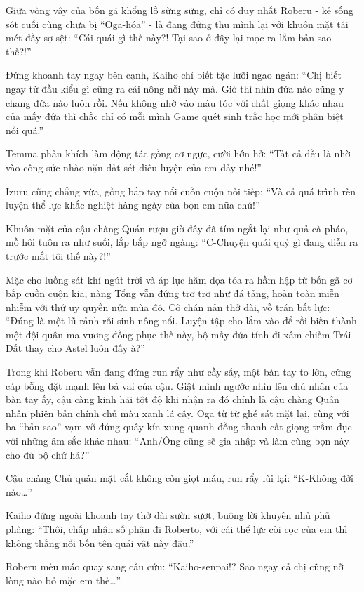 \documentclass[../main.tex]{subfiles}
\begin{document}
Giữa vòng vây của bốn gã khổng lồ sừng sững, chỉ có duy nhất Roberu - kẻ sống sót cuối cùng chưa bị ``Oga-hóa'' - là đang đứng thu mình lại với khuôn mặt tái mét đầy sợ sệt: ``Cái quái gì thế này?! Tại sao ở đây lại mọc ra lắm bản sao thế?!''

Đứng khoanh tay ngay bên cạnh, Kaiho chỉ biết tặc lưỡi ngao ngán: ``Chị biết ngay từ đầu kiểu gì cũng ra cái nông nỗi này mà. Giờ thì nhìn đứa nào cũng y chang đứa nào luôn rồi. Nếu không nhờ vào màu tóc với chất giọng khác nhau của mấy đứa thì chắc chỉ có mỗi mình Game quét sinh trắc học mới phân biệt nổi quá.''

Temma phấn khích làm động tác gồng cơ ngực, cười hớn hở: ``Tất cả đều là nhờ vào công sức nhào nặn đất sét điêu luyện của em đấy nhé!''

Izuru cũng chẳng vừa, gồng bắp tay nổi cuồn cuộn nối tiếp: ``Và cả quá trình rèn luyện thể lực khắc nghiệt hàng ngày của bọn em nữa chứ!''

Khuôn mặt của cậu chàng Quán rượu giờ đây đã tím ngắt lại như quả cà pháo, mồ hôi tuôn ra như suối, lắp bắp ngỡ ngàng: ``C-Chuyện quái quỷ gì đang diễn ra trước mắt tôi thế này?!''

Mặc cho luồng sát khí ngút trời và áp lực hăm dọa tỏa ra hầm hập từ bốn gã cơ bắp cuồn cuộn kia, nàng Tổng vẫn đứng trơ trơ như đá tảng, hoàn toàn miễn nhiễm với thứ uy quyền nửa mùa đó. Cô chán nản thở dài, vỗ trán bất lực: ``Đúng là một lũ rảnh rỗi sinh nông nổi. Luyện tập cho lắm vào để rồi biến thành một đội quân ma vương đồng phục thế này, bộ mấy đứa tính đi xâm chiếm Trái Đất thay cho Astel luôn đấy à?''

Trong khi Roberu vẫn đang đứng run rẩy như cầy sấy, một bàn tay to lớn, cứng cáp bỗng đặt mạnh lên bả vai của cậu. Giật mình ngước nhìn lên chủ nhân của bàn tay ấy, cậu càng kinh hãi tột độ khi nhận ra đó chính là cậu chàng Quân nhân phiên bản chính chủ màu xanh lá cây. Oga từ từ ghé sát mặt lại, cùng với ba ``bản sao'' vạm vỡ đứng quây kín xung quanh đồng thanh cất giọng trầm đục với những âm sắc khác nhau: ``Anh/Ông cũng sẽ gia nhập và làm cùng bọn này cho đủ bộ chứ hả?''

Cậu chàng Chủ quán mặt cắt không còn giọt máu, run rẩy lùi lại: ``K-Không đời nào\dots''

Kaiho đứng ngoài khoanh tay thở dài sườn sượt, buông lời khuyên nhủ phũ phàng: ``Thôi, chấp nhận số phận đi Roberto, với cái thể lực còi cọc của em thì không thắng nổi bốn tên quái vật này đâu.''

Roberu mếu máo quay sang cầu cứu: ``Kaiho-senpai!? Sao ngay cả chị cũng nỡ lòng nào bỏ mặc em thế\dots''
\end{document}
